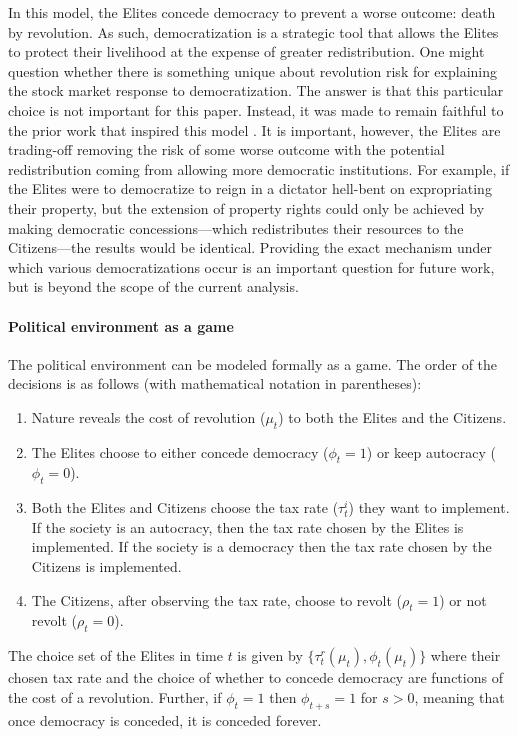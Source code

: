 \label{par:hell_bent}
In this model, the Elites concede democracy to prevent a worse outcome: death by revolution. As such, democratization is a strategic tool that allows the Elites to protect their livelihood at the expense of greater redistribution. One might question whether there is something unique about revolution risk for explaining the stock market response to democratization. The answer is that this particular choice is not important for this paper. Instead, it was made to remain faithful to the prior work that inspired this model \citep{Boix2003,Acemoglu2006}. It is important, however, the Elites are trading-off removing the risk of some worse outcome with the potential redistribution coming from allowing more democratic institutions. For example, if the Elites were to democratize to reign in a dictator hell-bent on expropriating their property, but the extension of property rights could only be achieved by making democratic concessions---which redistributes their resources to the Citizens---the results would be identical. Providing the exact mechanism under which various democratizations occur is an important question for future work, but is beyond the scope of the current analysis.

\paragraph{Political environment as a game}
The political environment can be modeled formally as a game. The order of the decisions is as follows (with mathematical notation in parentheses):
\begin{enumerate}
	\item Nature reveals the cost of revolution ($\mu_t$) to both the Elites and the Citizens.
	\item The Elites choose to either concede democracy ($\phi_t = 1$) or keep autocracy ($\phi_t = 0$).
	\item Both the Elites and Citizens choose the tax rate ($\tau_t^{i}$) they want to implement. If the society is an autocracy, then the tax rate chosen by the Elites is implemented. If the society is a democracy then the tax rate chosen by the Citizens is implemented.
	\item The Citizens, after observing the tax rate, choose to revolt ($\rho_t = 1$) or not revolt ($\rho_t = 0$).
\end{enumerate}

The choice set of the Elites in time $t$ is given by $\{\tau_t^r (\mu_t), \phi_t (\mu_t)\}$ where their chosen tax rate and the choice of whether to concede democracy are functions of the cost of a revolution. Further, if $\phi_t = 1$ then $\phi_{t+s} = 1$ for $s>0$, meaning that once democracy is conceded, it is conceded forever. 


